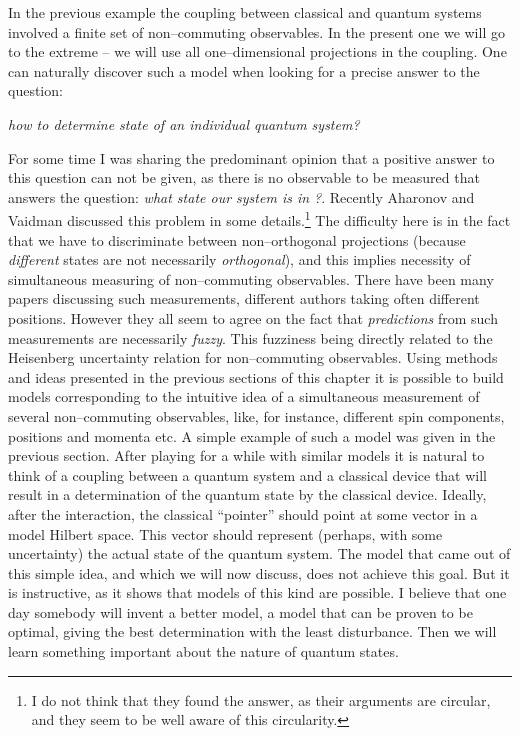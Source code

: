\documentclass[12pt]{article}
\begin{document}
In the previous example the coupling between classical and quantum
systems involved a finite set of non--commuting observables.  In the
present one we will go to the extreme -- we will use { all}
one--dimensional projections in the coupling.  One can naturally discover
such a model when looking for a precise answer to the question: 
\begin{center} {\em how
to determine state of an individual quantum system?}
\end{center}
For some time I was sharing the predominant opinion
 that a positive answer to this question can
not be given,  as there is no observable to be measured that answers the
question:  {\em what state our system is in ?}.  Recently Aharonov and
Vaidman
\cite{aha} discussed this problem in some details.\footnote{I do not
think that they found the answer,  as their arguments 
are circular,  and they seem to be well aware of this circularity. } 
The
difficulty here is in the fact that we have to discriminate between
non--orthogonal projections  (because {\em different} states are not
necessarily {\em orthogonal}),  and this implies necessity of 
simultaneous measuring
of non--commuting observables.  There have been many papers discussing
such measurements,  different authors taking often different positions.  
However they all seem to agree on  the fact that {\em
predictions} from such measurements are necessarily {\em fuzzy}.  
This fuzziness
being directly related to the Heisenberg uncertainty relation for
non--commuting observables.  Using methods and ideas presented 
in the previous 
sections of this chapter it is possible to build
models corresponding to the intuitive idea of a simultaneous
measurement of several non--commuting observables,  like,  for instance, 
 different spin components,  
positions {and}
momenta etc.  A simple example of such a model was given in the 
previous section.  
After playing for a while with similar models it is
natural to think of a coupling between a quantum system and a
classical device that will result in a determination of the quantum state
by the classical device.  Ideally,  after the interaction,  the classical
``pointer'' should point at some vector in a model
 Hilbert space.  This vector should
represent  (perhaps,  with some uncertainty) the actual state of the
quantum system.  The model that came out of this simple idea,  and which
we will now discuss,  does not achieve this goal.  But it is instructive, 
as it shows that models of this kind are possible.  I believe that one day
somebody will invent a better model,  a model that can be proven to be
optimal,  giving the best determination with the least disturbance.  Then
we will learn something important about the nature of quantum states. 
\end{document}
